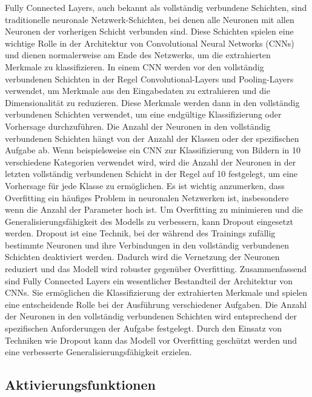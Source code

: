     Fully Connected Layers, auch bekannt als vollständig verbundene Schichten, sind traditionelle neuronale Netzwerk-Schichten, bei denen alle Neuronen mit allen Neuronen der vorherigen Schicht verbunden sind. Diese Schichten spielen eine wichtige Rolle in der Architektur von Convolutional Neural Networks (CNNs) und dienen normalerweise am Ende des Netzwerks, um die extrahierten Merkmale zu klassifizieren.   
    In einem CNN werden vor den vollständig verbundenen Schichten in der Regel Convolutional-Layers und Pooling-Layers verwendet, um Merkmale aus den Eingabedaten zu extrahieren und die Dimensionalität zu reduzieren. Diese Merkmale werden dann in den vollständig verbundenen Schichten verwendet, um eine endgültige Klassifizierung oder Vorhersage durchzuführen.    
    Die Anzahl der Neuronen in den vollständig verbundenen Schichten hängt von der Anzahl der Klassen oder der spezifischen Aufgabe ab. Wenn beispielsweise ein CNN zur Klassifizierung von Bildern in 10 verschiedene Kategorien verwendet wird, wird die Anzahl der Neuronen in der letzten vollständig verbundenen Schicht in der Regel auf 10 festgelegt, um eine Vorhersage für jede Klasse zu ermöglichen.    
    Es ist wichtig anzumerken, dass Overfitting ein häufiges Problem in neuronalen Netzwerken ist, insbesondere wenn die Anzahl der Parameter hoch ist. Um Overfitting zu minimieren und die Generalisierungsfähigkeit des Modells zu verbessern, kann Dropout eingesetzt werden. Dropout ist eine Technik, bei der während des Trainings zufällig bestimmte Neuronen und ihre Verbindungen in den vollständig verbundenen Schichten deaktiviert werden. Dadurch wird die Vernetzung der Neuronen reduziert und das Modell wird robuster gegenüber Overfitting.    
    Zusammenfassend sind Fully Connected Layers ein wesentlicher Bestandteil der Architektur von CNNs. Sie ermöglichen die Klassifizierung der extrahierten Merkmale und spielen eine entscheidende Rolle bei der Ausführung verschiedener Aufgaben. Die Anzahl der Neuronen in den vollständig verbundenen Schichten wird entsprechend der spezifischen Anforderungen der Aufgabe festgelegt. Durch den Einsatz von Techniken wie Dropout kann das Modell vor Overfitting geschützt werden und eine verbesserte Generalisierungsfähigkeit erzielen.

\subsection{Aktivierungsfunktionen}


